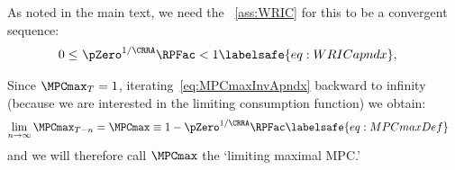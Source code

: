 \documentclass[\econtexRoot/BufferStockTheory]{subfiles}
\begin{document}
As noted in the main text, we need the \WRIC~\ref{ass:WRIC} for this to be a convergent sequence:
\begin{equation}\begin{gathered}\begin{aligned}
  0 \leq & ~\pZero^{1/\CRRA} \RPFac < 1 \labelsafe{eq:WRICapndx},
\end{aligned}\end{gathered}\end{equation}

Since $\MPCmax_{T}=1$, iterating~\eqref{eq:MPCmaxInvApndx} backward to
infinity (because we are interested in the limiting consumption function) we obtain:
\begin{equation}\begin{gathered}\begin{aligned}
\lim_{n\rightarrow\infty}\MPCmax_{T-n} 
& = \MPCmax \equiv 1-\pZero^{1/\CRRA}\RPFac  \labelsafe{eq:MPCmaxDef}
\end{aligned}\end{gathered}\end{equation}
and we will therefore call $\MPCmax$ the `limiting maximal MPC.'
\end{document}
